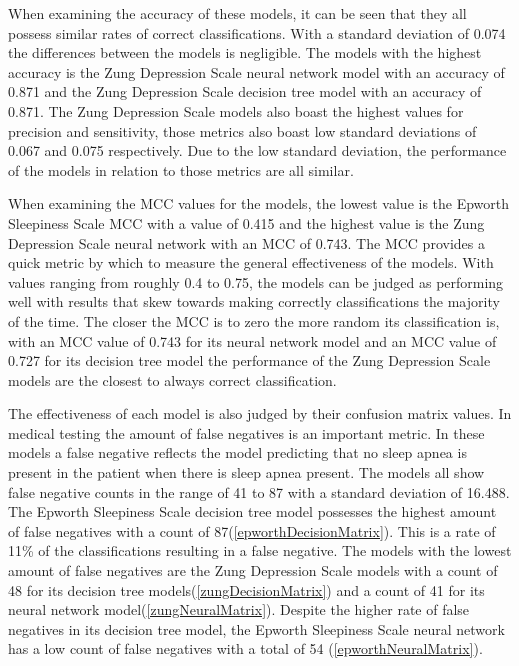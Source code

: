 \documentclass[10pt,conference,a4paper]{IEEEtran}
\begin{document}
When examining the accuracy of these models, it can be seen that they all possess similar rates of correct classifications. With a standard deviation of 0.074 the differences between the models is negligible. The models with the highest accuracy is the Zung Depression Scale neural network model with an accuracy of 0.871 and the Zung Depression Scale decision tree model with an accuracy of 0.871. The Zung Depression Scale models also boast the highest values for precision and sensitivity, those metrics also boast low standard deviations of 0.067 and 0.075 respectively. Due to the low standard deviation, the performance of the models in relation to those metrics are all similar. \par
When examining the MCC values for the models, the lowest value is the Epworth Sleepiness Scale MCC with a value of 0.415 and the highest value is the Zung Depression Scale neural network with an MCC of 0.743. The MCC provides a quick metric by which to measure the general effectiveness of the models. With values ranging from roughly 0.4 to 0.75, the models can be judged as performing well with results that skew towards making correctly classifications the majority of the time. The closer the MCC is to zero the more random its classification is, with an MCC value of 0.743 for its neural network model and an MCC value of 0.727 for its decision tree model the performance of the Zung Depression Scale models are the closest to always correct classification. \par
The effectiveness of each model is also judged by their confusion matrix values. In medical testing the amount of false negatives is an important metric. In these models a false negative reflects the model predicting that no sleep apnea is present in the patient when there is sleep apnea present. The models all show false negative counts in the range of 41 to 87 with a standard deviation of 16.488. The Epworth Sleepiness Scale decision tree model possesses the highest amount of false negatives with a count of 87(\autoref{epworthDecisionMatrix}). This is a rate of 11\% of the classifications resulting in a false negative. The models with the lowest amount of false negatives are the Zung Depression Scale models with a count of 48 for its decision tree models(\autoref{zungDecisionMatrix}) and a count of 41 for its neural network model(\autoref{zungNeuralMatrix}). Despite the higher rate of false negatives in its decision tree model, the Epworth Sleepiness Scale neural network has a low count of false negatives with a total of 54 (\autoref{epworthNeuralMatrix}). \par
\end{document}
